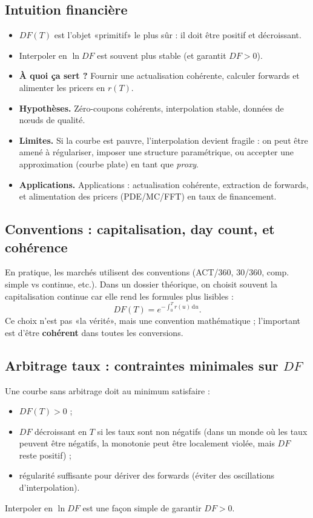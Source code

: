 \documentclass[11pt,a4paper]{report}
\theoremstyle{definition}
\theoremstyle{plain}
\theoremstyle{remark}
\newcommand{\dd}{\mathrm{d}}
\newcommand{\1}{\mathbf{1}}
\newcommand{\qa}[4]{
\begin{itemize}[leftmargin=*]
\item \textbf{À quoi ça sert ?} #1
\item \textbf{Hypothèses.} #2
\item \textbf{Limites.} #3
\item \textbf{Applications.} #4
\end{itemize}
}
\begin{document}
\subsection*{Intuition financière}
\begin{itemize}[leftmargin=*]
\item $DF(T)$ est l'objet «primitif» le plus sûr : il doit être positif et décroissant.
\item Interpoler en $\ln DF$ est souvent plus stable (et garantit $DF>0$).
\end{itemize}

\qa
{Fournir une actualisation cohérente, calculer forwards et alimenter les pricers en $r(T)$.}
{Zéro-coupons cohérents, interpolation stable, données de n\oe{}uds de qualité.}
{Si la courbe est pauvre, l'interpolation devient fragile : on peut être amené à régulariser, imposer une structure paramétrique, ou accepter une approximation (courbe plate) en tant que \emph{proxy}.}
{Applications : actualisation cohérente, extraction de forwards, et alimentation des pricers (PDE/MC/FFT) en taux de financement.}

\subsection*{Conventions : capitalisation, day count, et cohérence}
En pratique, les marchés utilisent des conventions (ACT/360, 30/360, comp. simple vs continue, etc.).
Dans un dossier théorique, on choisit souvent la capitalisation continue car elle rend les formules plus lisibles :
\[
DF(T)=e^{-\int_0^T r(u)\,\dd u}.
\]
Ce choix n'est pas «la vérité», mais une convention mathématique ; l'important est d'être \textbf{cohérent} dans toutes les conversions.

\subsection*{Arbitrage taux : contraintes minimales sur $DF$}
Une courbe sans arbitrage doit au minimum satisfaire :
\begin{itemize}[leftmargin=*]
\item $DF(T)>0$ ;
\item $DF$ décroissant en $T$ si les taux sont non négatifs (dans un monde où les taux peuvent être négatifs, la monotonie peut être localement violée, mais $DF$ reste positif) ;
\item régularité suffisante pour dériver des forwards (éviter des oscillations d'interpolation).
\end{itemize}
Interpoler en $\ln DF$ est une façon simple de garantir $DF>0$.
\end{document}
